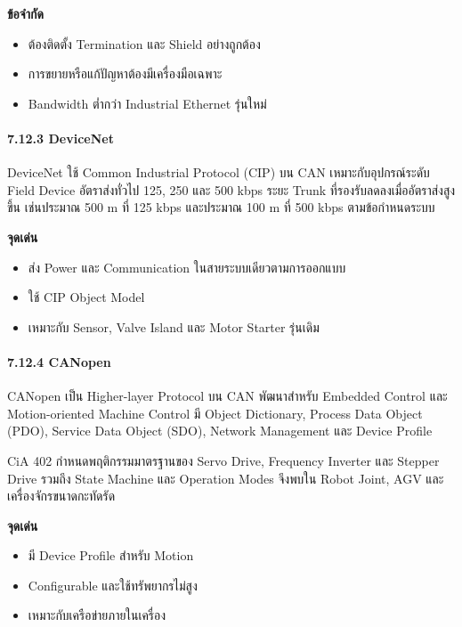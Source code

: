 \textbf{ข้อจำกัด}

\begin{itemize}
    \item ต้องติดตั้ง Termination และ Shield อย่างถูกต้อง
    \item การขยายหรือแก้ปัญหาต้องมีเครื่องมือเฉพาะ
    \item Bandwidth ต่ำกว่า Industrial Ethernet รุ่นใหม่
\end{itemize}

\paragraph{7.12.3 DeviceNet}

DeviceNet ใช้ Common Industrial Protocol (CIP) บน CAN เหมาะกับอุปกรณ์ระดับ Field Device อัตราส่งทั่วไป 125, 250 และ 500 kbps ระยะ Trunk ที่รองรับลดลงเมื่ออัตราส่งสูงขึ้น เช่นประมาณ 500 m ที่ 125 kbps และประมาณ 100 m ที่ 500 kbps ตามข้อกำหนดระบบ

\textbf{จุดเด่น}

\begin{itemize}
    \item ส่ง Power และ Communication ในสายระบบเดียวตามการออกแบบ
    \item ใช้ CIP Object Model
    \item เหมาะกับ Sensor, Valve Island และ Motor Starter รุ่นเดิม
\end{itemize}

\paragraph{7.12.4 CANopen}

CANopen เป็น Higher-layer Protocol บน CAN พัฒนาสำหรับ Embedded Control และ Motion-oriented Machine Control มี Object Dictionary, Process Data Object (PDO), Service Data Object (SDO), Network Management และ Device Profile

CiA 402 กำหนดพฤติกรรมมาตรฐานของ Servo Drive, Frequency Inverter และ Stepper Drive รวมถึง State Machine และ Operation Modes จึงพบใน Robot Joint, AGV และเครื่องจักรขนาดกะทัดรัด

\textbf{จุดเด่น}

\begin{itemize}
    \item มี Device Profile สำหรับ Motion
    \item Configurable และใช้ทรัพยากรไม่สูง
    \item เหมาะกับเครือข่ายภายในเครื่อง
\end{itemize}

